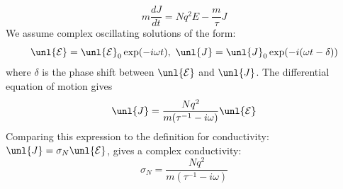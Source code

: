 \documentclass[a4paper, 11pt, normalem]{report}
\renewcommand\E{\mathcal{E}}
\newcommand\uE{\unl{\E}}
\newcommand\J{\unl{J}}
\begin{document}
\chapter{}
\begin{equation}
    m\frac{dJ}{dt} = Nq^2E - \frac{m}{\tau}J
\end{equation}
We assume complex oscillating solutions of the form:
\begin{equation}
    \uE = \uE_0\exp(-i\omega t),~ \J = \J_0\exp(-i(\omega t - \delta))
\end{equation}
where $\delta$ is the phase shift between $\uE$ and $\J$. The differential equation of motion gives
\begin{equation}
    \J = \frac{Nq^2}{m(\tau^{-1} - i\omega)}\uE
\end{equation}
Comparing this expression to the definition for conductivity: $\J = \sigma_N\uE$, gives a complex conductivity:
\begin{equation}
    \sigma_N = \frac{Nq^2}{m(\tau^{-1} - i\omega)}
\end{equation}
\end{document}
